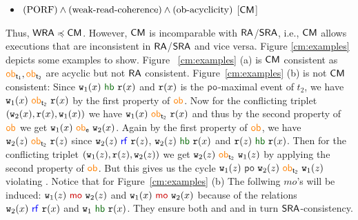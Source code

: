 \begin{itemize}
\item $(\text{PORF})\land(\text{weak-read-coherence})\land (\text{ob-acyclicity{}})$ \hfill [$\mathsf{CM}$]
\end{itemize}

Thus, $\mathsf{WRA}\preccurlyeq \mathsf{CM}$. However, $\mathsf{CM}$ is incomparable with $\mathsf{RA}$/$\mathsf{SRA}$, i.e., $\mathsf{CM}$ allows executions that are inconsistent in $\mathsf{RA}$/$\mathsf{SRA}$ and vice versa. Figure \ref{cm:examples} depicts some examples to show. Figure~ \ref{cm:examples} (a) is $\mathsf{CM}$ consistent as $\ob{t_1}, \ob{t_2}$ are acyclic but not $\mathsf{RA}$ consistent. Figure~\ref{cm:examples} (b) is not $\mathsf{CM}$ consistent: Since $\wt_1(x)~\hb~\rd(x)$ and $\mathtt{r}(x)$ is the $\po$-maximal event of $t_2$, we have $\wt_1(x)~\ob{t_2}~\rd(x)$ by the first property of $\ob{}$. Now for the conflicting triplet $(\mathtt{w}_2(x), \mathtt{r}(x), \mathtt{w}_1(x))$ we have $\wt_1(x)~\ob{t_2}~\rd(x)$ and thus by the second property of $\ob{}$ we get $\wt_1(x)~\ob{e}~\wt_2(x)$. Again by the first property of $\ob{}$, we have $\wt_2(z)~\ob{t_2}~\rd(z)$  since $\wt_2(z)~\rf~\rd(z)$, $\wt_2(z)~\hb~\rd(x)$ and $\rd(z)~\hb~\rd(x)$. Then for the conflicting triplet $(\mathtt{w}_1(z), \mathtt{r}(z), \mathtt{w}_2(z))$ we get $\wt_2(z)~\ob{t_2}~\wt_1(z)$ by applying the second property of $\ob{}$. But this gives us the cycle $\wt_1(z)~\po~\wt_2(z)~\ob{t_2}~\wt_1(z)$ violating \OB{}. Notice that for  Figure~\ref{cm:examples} (b) The follwing $mo$'s will be induced: $\wt_1(z)~\mo~\wt_2(z)$ and $\wt_1(x)~\mo~\wt_2(x)$ because of the relations $\wt_2(x)~\rf~\rd(x)$ and $\wt_1~\hb~\rd(x)$. They ensure both \RCoh{} and \SWCoh{} and in turn $\mathsf{SRA}$-consistency.

